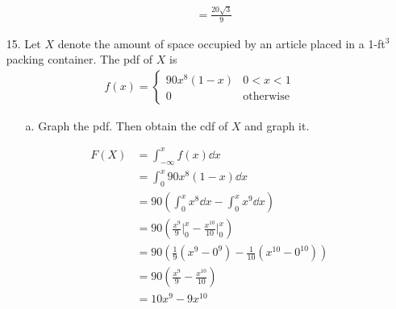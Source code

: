 \documentclass[letterpaper,12pt]{article}
\begin{document}
\begin{enumerate}
\begin{enumerate}
\begin{align*}
          &= \frac{20\sqrt{3}}{9}
        \end{align*}
    \end{enumerate}
  \item[15.]
    Let $X$ denote the amount of space occupied by an article placed in a 1-ft$^3$ packing container. The pdf of $X$ is
    \begin{align*}
      f(x) = \begin{cases}
        90x^8(1 - x) & 0 < x < 1 \\
        0            & \text{otherwise}
      \end{cases}
    \end{align*}
    \begin{enumerate}
      \item[a.]
        Graph the pdf. Then obtain the cdf of $X$ and graph it.
        \begin{center}
        \end{center}
        \begin{align*}
          F(X) &= \int_{-\infty}^{x} f(x) \dd{x} \\
          &= \int_{0}^{x} 90x^8(1 - x) \dd{x} \\
          &= 90 \left(\int_{0}^{x} x^8 \dd{x} - \int_{0}^{x} x^9 \dd{x}\right) \\
          &= 90 \left(\frac{x^9}{9} \bigg\rvert_{0}^{x} - \frac{x^{10}}{10} \bigg\rvert_{0}^{x}\right) \\
          &= 90 \left(\frac{1}{9}(x^9 - 0^9) - \frac{1}{10}(x^{10} - 0^{10})\right) \\
          &= 90 \left(\frac{x^9}{9} - \frac{x^{10}}{10}\right) \\
          &= 10x^9 - 9x^{10}
        \end{align*}

\end{enumerate}
\end{enumerate}
\end{document}
